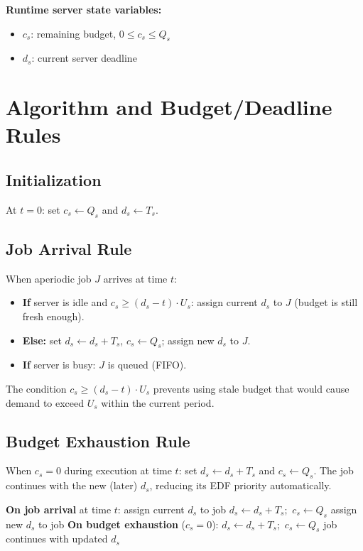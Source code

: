 \documentclass[conference]{IEEEtran}
\begin{document}
\noindent\textbf{Runtime server state variables:}
\begin{itemize}
  \item $c_s$: remaining budget, $0 \leq c_s \leq Q_s$
  \item $d_s$: current server deadline
\end{itemize}

\section{Algorithm and Budget/Deadline Rules}
\label{sec:algo}

\subsection{Initialization}
At $t = 0$: set $c_s \leftarrow Q_s$ and $d_s \leftarrow T_s$.

\subsection{Job Arrival Rule}
When aperiodic job $J$ arrives at time $t$:
\begin{itemize}
  \item \textbf{If} server is idle and $c_s \geq (d_s - t) \cdot U_s$:
        assign current $d_s$ to $J$ (budget is still fresh enough).
  \item \textbf{Else:} set $d_s \leftarrow d_s + T_s$,
        $c_s \leftarrow Q_s$; assign new $d_s$ to $J$.
  \item \textbf{If} server is busy: $J$ is queued (FIFO).
\end{itemize}

The condition $c_s \geq (d_s - t) \cdot U_s$ prevents using stale
budget that would cause demand to exceed $U_s$ within the current
period.

\subsection{Budget Exhaustion Rule}
When $c_s = 0$ during execution at time $t$:
set $d_s \leftarrow d_s + T_s$ and $c_s \leftarrow Q_s$.
The job continues with the new (later) $d_s$, reducing its EDF
priority automatically.

\begin{algorithm}
\caption{CBS scheduling decisions (simplified)}
\begin{algorithmic}[1]
\STATE \textbf{On job arrival} at time $t$:
  \STATE assign current $d_s$ to job
\ELSE
  \STATE $d_s \leftarrow d_s + T_s$;\ $c_s \leftarrow Q_s$
  \STATE assign new $d_s$ to job
\ENDIF
\STATE \textbf{On budget exhaustion} ($c_s = 0$):
\STATE $d_s \leftarrow d_s + T_s$;\ $c_s \leftarrow Q_s$
\STATE job continues with updated $d_s$
\end{algorithmic}
\end{algorithm}
\end{document}
